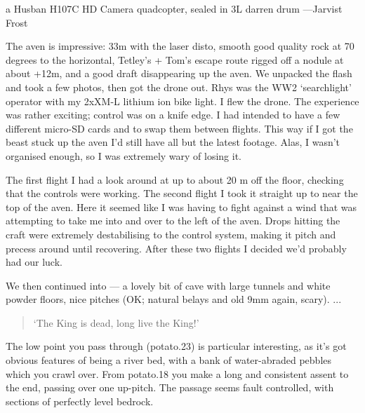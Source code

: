 \begin{marginfigure}
\checkoddpage \ifoddpage \forcerectofloat \else \forceversofloat \fi
\centering
 \caption{a Husban H107C HD Camera quadcopter, sealed in 3L darren drum ---Jarvist Frost}
 \label{quadcopter}
\end{marginfigure}

The aven is impressive: 33m with the laser disto, smooth good quality rock at 70 degrees to the horizontal, Tetley's + Tom's escape route rigged off a nodule at about +12m, and a good draft disappearing up the aven.
We unpacked the flash and took a few photos, then got the drone out. Rhys was the WW2 `searchlight' operator with my 2xXM-L lithium ion bike light. I flew the drone.
The experience was rather exciting; control was on a knife edge. I had intended to have a few different micro-SD cards and to swap them between flights. This way if I got the beast stuck up the aven I'd still have all but the latest footage. Alas, I wasn't organised enough, so I was extremely wary of losing it.

The first flight I had a look around at up to about 20 m off the floor, checking that the controls were working. The second flight I took it straight up to near the top of the aven. Here it seemed like I was having to fight against a wind that was attempting to take me into and over to the left of the aven. Drops hitting the craft were extremely destabilising to the control system, making it pitch and precess around until recovering. After these two flights I decided we'd probably had our luck.

We then continued into  --- a lovely bit of cave with large tunnels and white powder floors, nice pitches (OK; natural belays and old 9mm again, scary). ...

\begin{quote}
`The King is dead, long live the King!'
\end{quote}

The low point you pass through (potato.23) is particular interesting, as it's got obvious features of being a river bed, with a bank of water-abraded pebbles which you crawl over.
From potato.18 you make a long and consistent assent to the end, passing over one up-pitch. The passage seems fault controlled, with sections of perfectly level bedrock.

